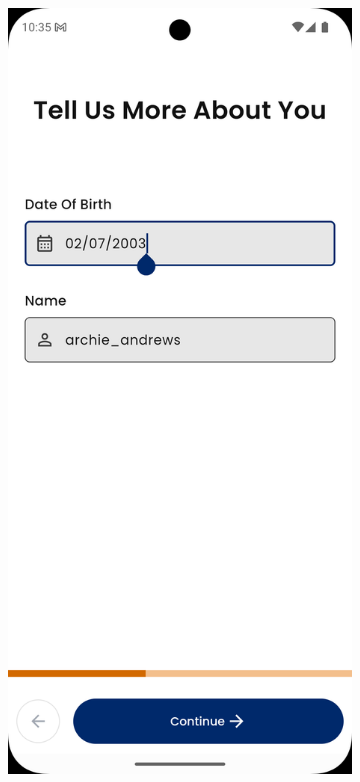 \begin{figure}[H]
    \centering
    \begin{subfigure}{0.32\textwidth}
        \includegraphics[width=1\linewidth]{figures/c4/4-2/basic_info_2.png} 

\end{subfigure}
\end{figure}
